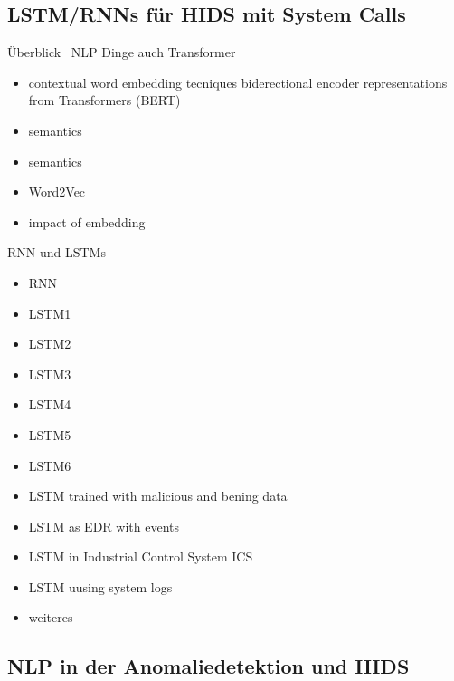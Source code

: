     \subsection{LSTM/RNNs für HIDS mit System Calls}
        Überblick~\cite{NLPHIDSSWORNA2022}
        NLP Dinge auch Transformer
        \begin{itemize}
            \item contextual word embedding tecniques biderectional encoder representations from Transformers (BERT)~\cite{NLPBERT2018}
            \item semantics~\cite{SEMANTICSLAKSHMANAN2015}
            \item semantics~\cite{SEMANTICSCREECH2014}
            \item Word2Vec~\cite{W2VWUNDERLICH2019}
            \item impact of embedding~\cite{IMPACTOFEMBEDDINGWUNDERLICH2020}
        \end{itemize}
        RNN und LSTMs
        \begin{itemize}
            \item RNN~\cite{RNN/CNN}
            \item LSTM1~\cite{LSTMsys}
            \item LSTM2~\cite{LSTMSURATKAR2019} 
            \item LSTM3~\cite{NIU2020} 
            \item LSTM4~\cite{BIDIRECTIONALLSTMCHAWLA2019} 
            \item LSTM5~\cite{VARIATIONALLSTMBOUZAR2019} 
            \item LSTM6~\cite{RNNVEDBOUZAR2020} 
            \item LSTM trained with malicious and bening data~\cite{LSTMKIM2016} %
            \item LSTM as EDR with events~\cite{EVENTLSTMVASQUEZ2020}
            \item LSTM in Industrial Control System ICS~\cite{ICSLSTMFENG2017} %
            \item LSTM uusing system logs~\cite{LOGLSTMMIN2017} %
            
            \item weiteres
        \end{itemize}

    \subsection{NLP in der Anomaliedetektion und HIDS}

